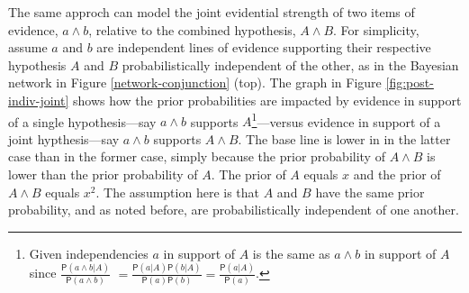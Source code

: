 \documentclass[10pt,dvipsnames,enabledeprecatedfontcommands]{scrartcl}
\newcommand{\pr}[1]{\mathsf{P}(#1)}
\begin{document}
The same approch can model the joint evidential strength of two items of
evidence, \(a \wedge b\), relative to the combined hypothesis,
\(A \wedge B\). For simplicity, assume \(a\) and \(b\) are independent
lines of evidence supporting their respective hypothesis \(A\) and \(B\)
probabilistically independent of the other, as in the Bayesian network
in Figure \ref{network-conjunction} (top). The graph in Figure
\ref{fig:post-indiv-joint} shows how the prior probabilities are
impacted by evidence in support of a single hypothesis---say
\(a\wedge b\) supports
\(A\)\footnote{Given independencies $a$ in support of $A$ is the same as $a\wedge b$ in support of $A$ since $\frac{\pr{a\wedge b \vert A}}{\pr{a \wedge b}}$ $=\frac{\pr{a \vert A}\pr{b \vert A}}{\pr{a}\pr{b}}=\frac{\pr{a \vert A}}{\pr{a}}$.}---versus
evidence in support of a joint hypthesis---say \(a\wedge b\) supports
\(A \wedge B\). The base line is lower in in the latter case than in the
former case, simply because the prior probability of \(A \wedge B\) is
lower than the prior probability of \(A\). The prior of \(A\) equals
\(x\) and the prior of \(A\wedge B\) equals \(x^2\). The assumption here
is that \(A\) and \(B\) have the same prior probability, and as noted
before, are probabilistically independent of one another.
\end{document}
